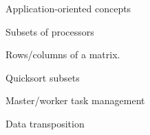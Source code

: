 






 {Application-oriented concepts}

 {Subsets of processors}

Rows/columns of a matrix.

Quicksort subsets

 {Master/worker task management}

 {Data transposition}
